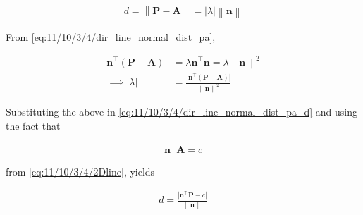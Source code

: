 \documentclass[12pt]{article}
\providecommand{\brak}[1]{\ensuremath{\left(#1\right)}}
\providecommand{\norm}[1]{\left\lVert#1\right\rVert}
\providecommand{\abs}[1]{\left\vert#1\right\vert}
\let\vec\mathbf
\begin{document}
\begin{enumerate}
\begin{enumerate}
\begin{align}
	\label{eq:11/10/3/4/dir_line_normal_dist_pa_d}
d = 	\norm{\vec{P}- \vec{A}}= \abs{\lambda} \norm{\vec{n}}
\end{align}

From 
	\eqref{eq:11/10/3/4/dir_line_normal_dist_pa},

\begin{align}
	\vec{n}^{\top}
	\brak{\vec{P}- \vec{A}} &=  \lambda \vec{n}^{\top}\vec{n} = \lambda\norm{\vec{n}}^2
	\\
	\implies \abs{\lambda}&= \frac{\abs{\vec{n}^{\top}
	\brak{\vec{P}- \vec{A}}}}{\norm{\vec{n}}^2} 
\end{align}

Substituting the above in \eqref{eq:11/10/3/4/dir_line_normal_dist_pa_d} and using the fact that

\begin{align}
   \vec{n}^{\top}\vec{A} = c
\end{align}

from 	\eqref{eq:11/10/3/4/2Dline}, yields 

\begin{align}
	\label{eq:11/10/3/4/line_dist_2d}
	d = \frac{\abs{   \vec{n}^{\top}\vec{P}-c }}{\norm{\vec{n}}}	
\end{align}


\end{enumerate}
\end{enumerate}
\end{document}
